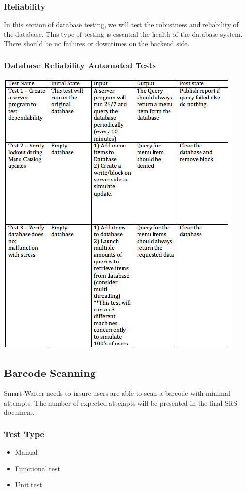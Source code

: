 \documentclass[12pt]{article}
\begin{document}
\subsubsection{Reliability}
In this section of database testing, we will test the robustness and reliability of the database.  This type of testing is essential the health of the database system. There should be no failures or downtimes on the backend side. 
\subsubsection{Database Reliability Automated Tests }
\includegraphics[width=\textwidth,height=\textheight,keepaspectratio]{reliability_tests.png}

\subsection{Barcode Scanning}
Smart-Waiter needs to insure users are able to scan a barcode with minimal attempts. The number of expected attempts will be presented in the final SRS document.

\subsubsection{Test Type}
\begin{itemize}
  \item Manual
  \item Functional test
  \item Unit test
\end{itemize}
\end{document}
